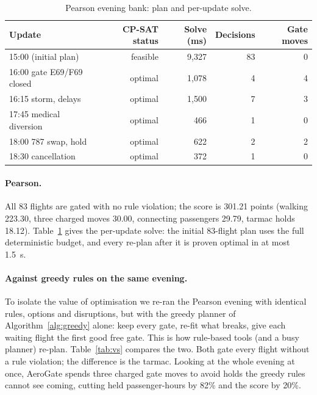 \documentclass[11pt]{article}
\theoremstyle{remark}
\begin{document}
\begin{table}[htbp]
\centering
\caption{Pearson evening bank: plan and per-update solve.}
\label{tab:yyz}
\begin{tabular}{lrrrr}
\toprule
Update & CP-SAT status & Solve (ms) & Decisions & Gate moves\\
\midrule
15:00 (initial plan) & feasible & 9{,}327 & 83 & 0\\
16:00 gate E69/F69 closed & optimal & 1{,}078 & 4 & 4\\
16:15 storm, delays & optimal & 1{,}500 & 7 & 3\\
17:45 medical diversion & optimal & 466 & 1 & 0\\
18:00 787 swap, hold & optimal & 622 & 2 & 2\\
18:30 cancellation & optimal & 372 & 1 & 0\\
\bottomrule
\end{tabular}
\end{table}

\paragraph{Pearson.} All 83 flights are gated with no rule violation; the score is 301.21 points
(walking 223.30, three charged moves 30.00, connecting passengers 29.79, tarmac holds 18.12).
Table~\ref{tab:yyz} gives the per-update solve: the initial 83-flight plan uses the full deterministic
budget, and every re-plan after it is proven optimal in at most 1.5~s.

\paragraph{Against greedy rules on the same evening.} To isolate the value of optimisation we re-ran
the Pearson evening with identical rules, options and disruptions, but with the greedy planner of
Algorithm~\ref{alg:greedy} alone: keep every gate, re-fit what breaks, give each waiting flight the
first good free gate. This is how rule-based tools (and a busy planner) re-plan. Table~\ref{tab:vs}
compares the two. Both gate every flight without a rule violation; the difference is the tarmac.
Looking at the whole evening at once, AeroGate spends three charged gate moves to avoid holds the
greedy rules cannot see coming, cutting held passenger-hours by 82\% and the score by 20\%.
\end{document}
